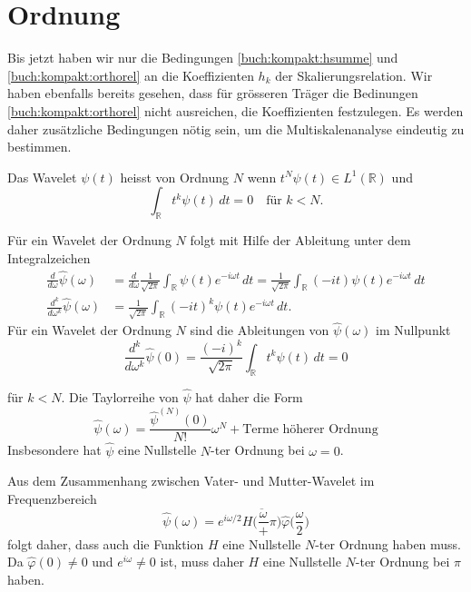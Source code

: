 %
%
%
\section{Ordnung\label{section:ordnung}}
Bis jetzt haben wir nur die Bedingungen \eqref{buch:kompakt:hsumme}
und \eqref{buch:kompakt:orthorel} an die Koeffizienten 
$h_k$ der Skalierungsrelation.
Wir haben ebenfalls bereits gesehen, dass für grösseren Träger die
Bedinungen \eqref{buch:kompakt:orthorel} nicht ausreichen, die
Koeffizienten festzulegen.
Es werden daher zusätzliche Bedingungen nötig sein, um die
Multiskalenanalyse eindeutig zu bestimmen.

\begin{definition}
Das Wavelet $\psi(t)$ heisst von Ordnung $N$ wenn
$t^N\psi(t)\in L^1(\mathbb R)$ und
\[
\int_{\mathbb R} t^k\psi(t)\,dt=0\quad \text{für $k<N$.}
\]%
\label{definition:ordnung}
\end{definition}

Für ein Wavelet der Ordnung $N$ folgt mit Hilfe der Ableitung unter
dem Integralzeichen
\begin{align*}
\frac{d}{d\omega}
\hat{\psi}(\omega)
&=
\frac{d}{d\omega}
\frac{1}{\sqrt{2\pi}}
\int_{\mathbb R}
\psi(t) e^{-i\omega t}\,dt
=
\frac{1}{\sqrt{2\pi}}
\int_{\mathbb R}
(-it)
\psi(t) e^{-i\omega t}\,dt
\\
\frac{d^k}{d\omega^k}
\hat{\psi}(\omega)
&=
\frac{1}{\sqrt{2\pi}}
\int_{\mathbb R}
(-it)^k
\psi(t) e^{-i\omega t}\,dt.
\end{align*}
Für ein Wavelet der Ordnung $N$ sind die Ableitungen von $\hat{\psi}(\omega)$
im Nullpunkt
\[
\frac{d^k}{d\omega^k}
\hat{\psi}(0)
=
\frac{(-i)^k}{\sqrt{2\pi}}
\int_{\mathbb R} t^k \psi(t) \,dt = 0
\]

für $k<N$. 
Die Taylorreihe von $\hat{\psi}$ hat daher die Form
\[
\hat{\psi}(\omega)
=
\frac{\hat{\psi}^{(N)}(0)}{N!} \omega^N + \text{Terme höherer Ordnung}
\]
Insbesondere hat $\hat{\psi}$ eine Nullstelle $N$-ter Ordnung bei $\omega=0$.

Aus dem Zusammenhang zwischen Vater- und Mutter-Wavelet im Frequenzbereich
\[
\hat{\psi}(\omega)
=
e^{i\omega/2}
\overline{H\biggl(\frac{\omega}+\pi\biggr)}
\hat{\varphi}\biggl(\frac{\omega}2\biggr)
\]
folgt daher, dass auch die Funktion $H$ eine Nullstelle $N$-ter
Ordnung haben muss.
Da $\hat{\varphi}(0)\ne 0$ und $e^{i\omega}\ne 0$ ist, muss daher
$H$ eine Nullstelle $N$-ter Ordnung bei $\pi$ haben.

